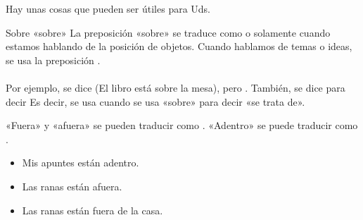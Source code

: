 Hay unas cosas que pueden ser \'utiles
para Uds.

\begin{conf}{Sobre «sobre»}
	La preposici\'on «sobre» se traduce como  o  solamente
	cuando estamos hablando de la posici\'on de objetos. Cuando hablamos de temas
	o ideas, se usa la preposici\'on . \\ \\

	Por ejemplo, se dice  (El libro est\'a sobre
	la mesa), pero . Tambi\'en, se dice
	 para decir  Es decir, se usa 
	cuando se usa «sobre» para decir «se trata de».
\end{conf}

«Fuera» y «afuera» se pueden traducir como .
«Adentro» se puede traducir como .

\begin{itemize}
	\item Mis apuntes est\'an adentro.
		\arr {}
	\item Las ranas est\'an afuera.
		\arr {}
	\item Las ranas est\'an fuera de la casa.
		\arr {}
\end{itemize}

